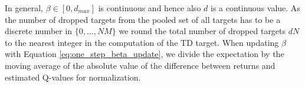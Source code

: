 In general, $\beta \in [0,d_{max}]$ is continuous and hence also $d$ is a continuous value. As  the number of dropped targets from the pooled set of all targets has to be a discrete number in $\{0, \dots, NM\}$ we round the total number of dropped targets $d N$ to the nearest integer in the computation of the TD target.
When updating $\beta$ with Equation \ref{eq:one_step_beta_update}, we divide the expectation by the moving average of the absolute value of the difference between returns and estimated Q-values for normalization.